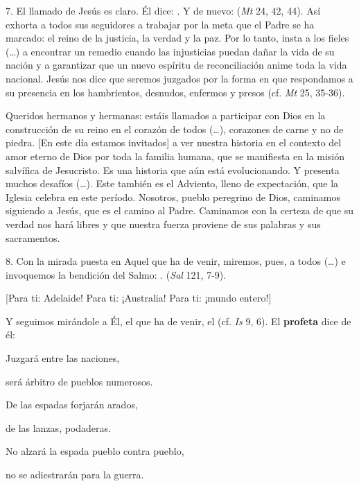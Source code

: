\begin{body}
	7. El llamado de Jesús es claro. Él dice: . Y de nuevo:  (\emph{Mt} 24, 42, 44). Así exhorta a todos sus seguidores a trabajar por la meta que el Padre se ha marcado: el reino de la justicia, la verdad y la paz. Por lo tanto, insta a los fieles (\ldots{}) a encontrar un remedio cuando las injusticias puedan dañar la vida de su nación y a garantizar que un nuevo espíritu de reconciliación anime toda la vida nacional. Jesús nos dice que seremos juzgados por la forma en que respondamos a su presencia en los hambrientos, desnudos, enfermos y presos (cf. \emph{Mt} 25, 35-36).
	
	Queridos hermanos y hermanas: estáis llamados a participar con Dios en la construcción de su reino en el corazón de todos (\ldots{}), corazones de carne y no de piedra. {[}En este día estamos invitados{]} a ver nuestra historia en el contexto del amor eterno de Dios por toda la familia humana, que se manifiesta en la misión salvífica de Jesucristo. Es una historia que aún está evolucionando. Y presenta muchos desafíos (\ldots{}). Este también es el Adviento, lleno de expectación, que la Iglesia celebra en este período. Nosotros, pueblo peregrino de Dios, caminamos siguiendo a Jesús, que es el camino al Padre. Caminamos con la certeza de que su verdad nos hará libres y que nuestra fuerza proviene de sus palabras y sus sacramentos.
	
	8. Con la mirada puesta en Aquel que ha de venir, miremos, pues, a todos (\ldots{}) e invoquemos la bendición del Salmo: . (\emph{Sal} 121, 7-9).
	
	{[}Para ti: Adelaide! Para ti: ¡Australia! Para ti: ¡mundo entero!{]} 
	
	Y seguimos mirándole a Él, el que ha de venir, el  (cf. \emph{Is} 9, 6). El \textbf{profeta} dice de él: 
	
	Juzgará entre las naciones, 
	
	será árbitro de pueblos numerosos. 
	
	De las espadas forjarán arados, 
	
	de las lanzas, podaderas. 
	
	No alzará la espada pueblo contra pueblo, 
	
	no se adiestrarán para la guerra. 
	

\end{body}
